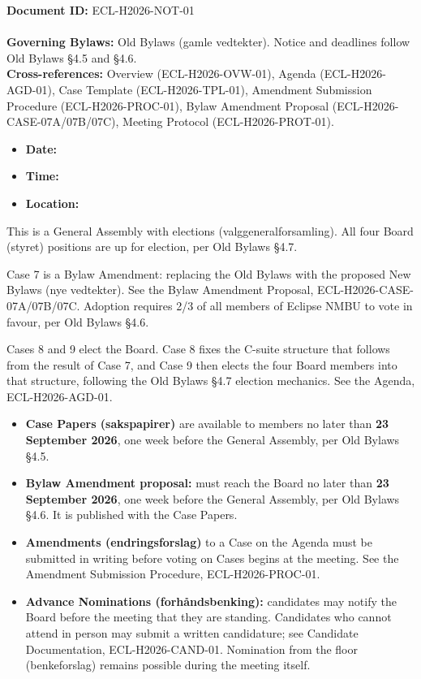 \documentclass{../../../Common/Latex/Templates/rapport}
\date{\meetingdate, \meetingtime}
\begin{document}
\makecoverpage
\tableofcontents
\reportmainmatter

\noindent\textbf{Document ID:} ECL-H2026-NOT-01\\
\meetingline\\
\textbf{Governing Bylaws:} Old Bylaws (gamle vedtekter). Notice and deadlines follow Old Bylaws \S4.5 and \S4.6.\\
\textbf{Cross-references:} Overview (ECL-H2026-OVW-01), Agenda (ECL-H2026-AGD-01), Case Template (ECL-H2026-TPL-01), Amendment Submission Procedure (ECL-H2026-PROC-01), Bylaw Amendment Proposal (ECL-H2026-CASE-07A/07B/07C), Meeting Protocol (ECL-H2026-PROT-01).

\begin{itemize}
  \item \textbf{Date:} \meetingdate
  \item \textbf{Time:} \meetingtime
  \item \textbf{Location:} \meetinglocation
\end{itemize}

This is a General Assembly with elections (valggeneralforsamling). All four Board (styret) positions are up for election, per Old Bylaws \S4.7.

Case 7 is a Bylaw Amendment: replacing the Old Bylaws with the proposed New Bylaws (nye vedtekter). See the Bylaw Amendment Proposal, ECL-H2026-CASE-07A/07B/07C. Adoption requires 2/3 of all members of Eclipse NMBU to vote in favour, per Old Bylaws \S4.6.

Cases 8 and 9 elect the Board. Case 8 fixes the C-suite structure that follows from the result of Case 7, and Case 9 then elects the four Board members into that structure, following the Old Bylaws \S4.7 election mechanics. See the Agenda, ECL-H2026-AGD-01.


\begin{itemize}
  \item \textbf{Case Papers (sakspapirer)} are available to members no later than \textbf{23 September 2026}, one week before the General Assembly, per Old Bylaws \S4.5.
  \item \textbf{Bylaw Amendment proposal:} must reach the Board no later than \textbf{23 September 2026}, one week before the General Assembly, per Old Bylaws \S4.6. It is published with the Case Papers.
  \item \textbf{Amendments (endringsforslag)} to a Case on the Agenda must be submitted in writing before voting on Cases begins at the meeting. See the Amendment Submission Procedure, ECL-H2026-PROC-01.
  \item \textbf{Advance Nominations (forhåndsbenking):} candidates may notify the Board before the meeting that they are standing. Candidates who cannot attend in person may submit a written candidature; see Candidate Documentation, ECL-H2026-CAND-01. Nomination from the floor (benkeforslag) remains possible during the meeting itself.
\end{itemize}
\end{document}
